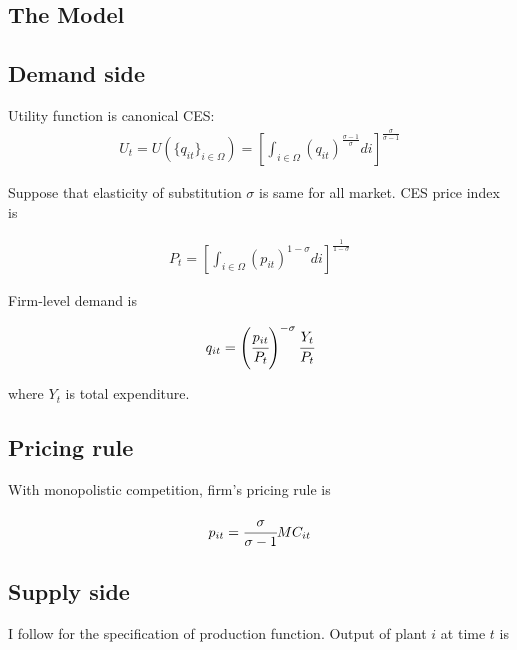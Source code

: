 \documentclass[11pt,letter]{article}
\newcommand{\prn}[1]{\left({#1}\right)}
\newcommand{\lmprn}[1]{\big\{{#1}\big\}}
\newcommand{\lprn}[1]{\left[{#1}\right]}
\newcommand{\cf}[2]{\cfrac{#1}{#2}}
\begin{document}
\begin{appendices}

\section{The Model}\label{model}

\subsection{Demand side}

Utility function is canonical CES:
\begin{align}
U_t = U\prn{\lmprn{q_{it}}_{i\in\Omega}} = \lprn{\int_{i\in\Omega} \prn{q_{it}}^{\frac{\sigma-1}{\sigma}}di }^{\frac{\sigma}{\sigma-1}}
\end{align}

\noindent  Suppose that elasticity of substitution $\sigma$ is same for all market. CES price index is

\begin{align}
P_t = \lprn{\int_{i\in\Omega} \prn{p_{it}}^{1-\sigma}di}^{\frac{1}{1-\sigma}}
\end{align}

\noindent Firm-level demand is 

\begin{align}
q_{it} = \prn{\cf{p_{it}}{P_t}}^{-\sigma}\cf{Y_t}{P_t}
\end{align}

\noindent where $Y_t$ is total expenditure. 

\subsection{Pricing rule}

With monopolistic competition, firm's pricing rule is

\begin{align}
p_{it} = \cf{\sigma}{\sigma-1}MC_{it} \label{pricingrule}
\end{align}

\subsection{Supply side}

I follow \citet{Kasahara2008} for the specification of production function. Output of plant $i$ at time $t$ is 


\end{appendices}
\end{document}
